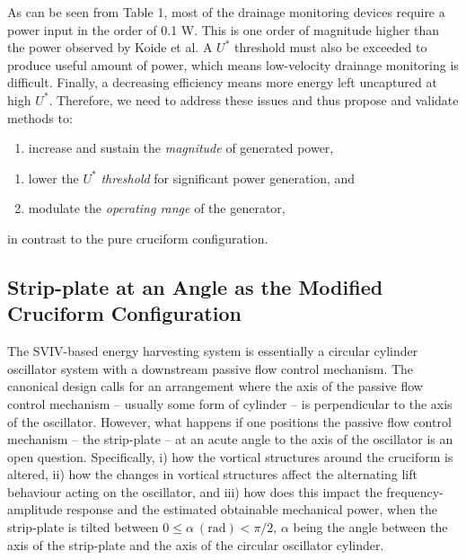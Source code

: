 \documentclass[]{article}
\begin{document}
As can be seen from Table 1, most of the drainage monitoring devices
require a power input in the order of 0.1 W. This is one order of
magnitude higher than the power observed by Koide et al. A \(U^{*}\)
threshold must also be exceeded to produce useful amount of power, which
means low-velocity drainage monitoring is difficult. Finally, a
decreasing efficiency means more energy left uncaptured at high
\(U^{*}\). Therefore, we need to address these issues and thus propose
and validate methods to:

\begin{enumerate}
\def\labelenumi{\roman{enumi})}
\item
  increase and sustain the \emph{magnitude} of generated power,
\end{enumerate}

\begin{enumerate}
\def\labelenumi{\roman{enumi})}
\item
  lower the \(U^{*}\) \emph{threshold} for significant power generation,
  and
\item
  modulate the \emph{operating range} of the generator,
\end{enumerate}

in contrast to the pure cruciform configuration.

\hypertarget{strip-plate-at-an-angle-as-the-modified-cruciform-configuration}{\subsection{Strip-plate
at an Angle as the Modified Cruciform
Configuration}\label{strip-plate-at-an-angle-as-the-modified-cruciform-configuration}}

The SVIV-based energy harvesting system is essentially a circular
cylinder oscillator system with a downstream passive flow control
mechanism. The canonical design calls for an arrangement where the axis
of the passive flow control mechanism -- usually some form of cylinder
-- is perpendicular to the axis of the oscillator. However, what happens
if one positions the passive flow control mechanism -- the strip-plate
-- at an acute angle to the axis of the oscillator is an open question.
Specifically, i) how the vortical structures around the cruciform is
altered, ii) how the changes in vortical structures affect the
alternating lift behaviour acting on the oscillator, and iii) how does
this impact the frequency-amplitude response and the estimated
obtainable mechanical power, when the strip-plate is tilted between
\(0 \leq \alpha\ \left( \text{rad} \right) < \pi/2\), \(\alpha\) being
the angle between the axis of the strip-plate and the axis of the
circular oscillator cylinder.
\end{document}
